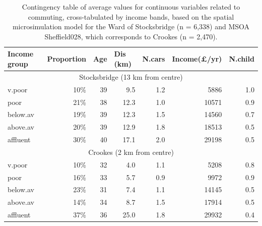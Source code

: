 \documentclass[a4paper, 11pt, twoside]{Thesis}
\begin{document}
\begin{table}[h*]
\caption[Commuting characteristics cross-tabulated by income bands]
{Contingency table of average values for continuous variables related to commuting,
cross-tabulated by income bands, based on the spatial microsimulation
model for the Ward of Stocksbridge (n = 6,338) and MSOA Sheffield028, which
corresponds to Crookes (n = 2,470).}
\begin{center}
\begin{tabular}{lrrrrrr}
\toprule
Income group & \multicolumn{1}{l}{Proportion} & \multicolumn{1}{l}{Age} &
\multicolumn{1}{l}{Dis (km)} & \multicolumn{1}{l}{N.cars} &
\multicolumn{1}{l}{Income(\pounds/yr)} & \multicolumn{1}{l}{N.child} \\ \midrule
\multicolumn{7}{c}{Stocksbridge (13 km from centre)} \\ \midrule
v.poor & 10\% & 39 & 9.5 & 1.2 & 5886 & 1.0 \\ 
poor & 21\% & 38 & 12.3 & 1.0 & 10571 & 0.9 \\ 
below.av & 19\% & 39 & 12.3 & 1.5 & 14560 & 0.7 \\ 
above.av & 20\% & 39 & 12.9 & 1.8 & 18513 & 0.5 \\ 
affluent & 30\% & 40 & 17.1 & 2.0 & 29198 & 0.5 \\ \midrule
\multicolumn{7}{c}{Crookes (2 km from centre)} \\ \midrule
v.poor &  10\% & 32 & 4.0 & 1.1 & 5208 & 0.8 \\ 
poor & 16\% & 33 & 5.7 & 0.9 & 9972 & 0.9 \\ 
below.av & 23\% & 31 & 7.4 & 1.1 & 14145 & 0.5 \\ 
above.av & 14\% & 34 & 8.7 & 1.5 & 17914 & 0.5 \\ 
affluent & 37\% & 36 & 25.0 & 1.8 & 29932 & 0.4 \\
\bottomrule
\end{tabular}             \end{center}
\label{t:msim-res2}
\end{table}
\end{document}
